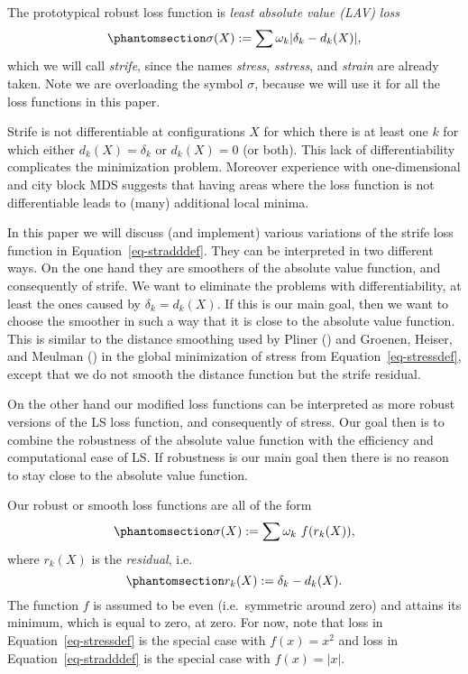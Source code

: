 \documentclass[
  12pt,
  letterpaper,
  DIV=11,
  numbers=noendperiod]{scrartcl}
\theoremstyle{definition}
\theoremstyle{definition}
\theoremstyle{plain}
\theoremstyle{plain}
\theoremstyle{plain}
\theoremstyle{remark}
\begin{document}
The prototypical robust loss function is \emph{least absolute value
(LAV) loss} \begin{equation}\phantomsection\label{eq-stradddef}{
\sigma(X):=\sum \omega_k|\delta_k-d_k(X)|,
}\end{equation} which we will call \emph{strife}, since the names
\emph{stress}, \emph{sstress}, and \emph{strain} are already taken. Note
we are overloading the symbol \(\sigma\), because we will use it for all
the loss functions in this paper.

Strife is not differentiable at configurations \(X\) for which there is
at least one \(k\) for which either \(d_k(X)=\delta_k\) or \(d_k(X)=0\)
(or both). This lack of differentiability complicates the minimization
problem. Moreover experience with one-dimensional and city block MDS
suggests that having areas where the loss function is not differentiable
leads to (many) additional local minima.

In this paper we will discuss (and implement) various variations of the
strife loss function in Equation~\ref{eq-stradddef}. They can be
interpreted in two different ways. On the one hand they are smoothers of
the absolute value function, and consequently of strife. We want to
eliminate the problems with differentiability, at least the ones caused
by \(\delta_k=d_k(X)\). If this is our main goal, then we want to choose
the smoother in such a way that it is close to the absolute value
function. This is similar to the distance smoothing used by Pliner
() and Groenen, Heiser, and Meulman
() in the global
minimization of stress from Equation~\ref{eq-stressdef}, except that we
do not smooth the distance function but the strife residual.

On the other hand our modified loss functions can be interpreted as more
robust versions of the LS loss function, and consequently of stress. Our
goal then is to combine the robustness of the absolute value function
with the efficiency and computational ease of LS. If robustness is our
main goal then there is no reason to stay close to the absolute value
function.

Our robust or smooth loss functions are all of the form
\begin{equation}\phantomsection\label{eq-strifedef}{
\sigma(X):=\sum\omega_k\ f(r_k(X)),
}\end{equation} where \(r_k(X)\) is the \emph{residual}, i.e.
\begin{equation}\phantomsection\label{eq-resdef}{
r_k(X):=\delta_k-d_k(X).
}\end{equation} The function \(f\) is assumed to be even (i.e.~symmetric
around zero) and attains its minimum, which is equal to zero, at zero.
For now, note that loss in Equation~\ref{eq-stressdef} is the special
case with \(f(x)=x^2\) and loss in Equation~\ref{eq-stradddef} is the
special case with \(f(x)=|x|\).
\end{document}
